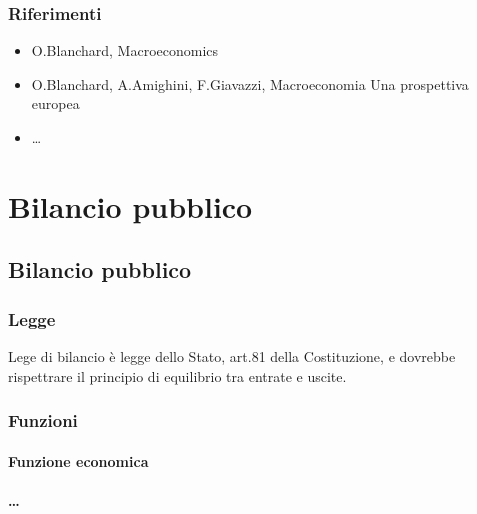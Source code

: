 \documentclass[letterpaper,10pt,italian]{jupyterBook}
\begin{document}
\section{Riferimenti}
\label{\detokenize{ch/macro:riferimenti}}\begin{itemize}
\item {} 
\sphinxAtStartPar
O.Blanchard, Macroeconomics

\item {} 
\sphinxAtStartPar
O.Blanchard, A.Amighini, F.Giavazzi, Macroeconomia \sphinxhyphen{} Una prospettiva europea

\item {} 
\sphinxAtStartPar
…

\end{itemize}

\sphinxstepscope


\part{Bilancio pubblico}

\sphinxstepscope


\chapter{Bilancio pubblico}
\label{\detokenize{ch/public:bilancio-pubblico}}\label{\detokenize{ch/public:economics-hs-public}}\label{\detokenize{ch/public::doc}}

\section{Legge}
\label{\detokenize{ch/public:legge}}
\sphinxAtStartPar
Lege di bilancio è legge dello Stato, art.81 della Costituzione, e dovrebbe rispettrare il principio di equilibrio tra entrate e uscite.


\section{Funzioni}
\label{\detokenize{ch/public:funzioni}}

\subsection{Funzione economica}
\label{\detokenize{ch/public:funzione-economica}}

\subsection{…}
\label{\detokenize{ch/public:id1}}
\end{document}
